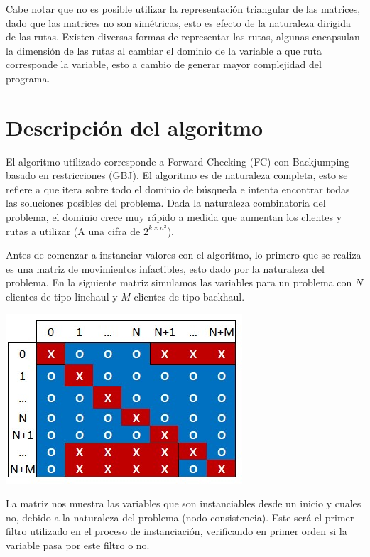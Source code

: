 \documentclass[letter, 10pt]{article}
\begin{document}
Cabe notar que no es posible utilizar la representación triangular de las matrices, dado que las matrices no son simétricas, esto es efecto de la naturaleza dirigida de las rutas. Existen diversas formas de representar las rutas, algunas encapsulan la dimensión de las rutas al cambiar el dominio de la variable a que ruta corresponde la variable, esto a cambio de generar mayor complejidad del programa.

\section{Descripción del algoritmo}
El algoritmo utilizado corresponde a Forward Checking (FC) con Backjumping basado en restricciones (GBJ). El algoritmo es de naturaleza completa, esto se refiere a que itera sobre todo el dominio de búsqueda e intenta encontrar todas las soluciones posibles del problema. Dada la naturaleza combinatoria del problema, el dominio crece muy rápido a medida que aumentan los clientes y rutas a utilizar (A una cifra de $2^{k \times n^2}$).

Antes de comenzar a instanciar valores con el algoritmo, lo primero que se realiza es una matriz de movimientos infactibles, esto dado por la naturaleza del problema. En la siguiente matriz simulamos las variables para un problema con $N$ clientes de tipo linehaul y $M$ clientes de tipo backhaul.

\begin{center}
\includegraphics[scale=0.75]{Matriz factible.jpg}
\end{center}

La matriz nos muestra las variables que son instanciables desde un inicio y cuales no, debido a la naturaleza del problema (nodo consistencia). Este será el primer filtro utilizado en el proceso de instanciación, verificando en primer orden si la variable pasa por este filtro o no.
\end{document}
